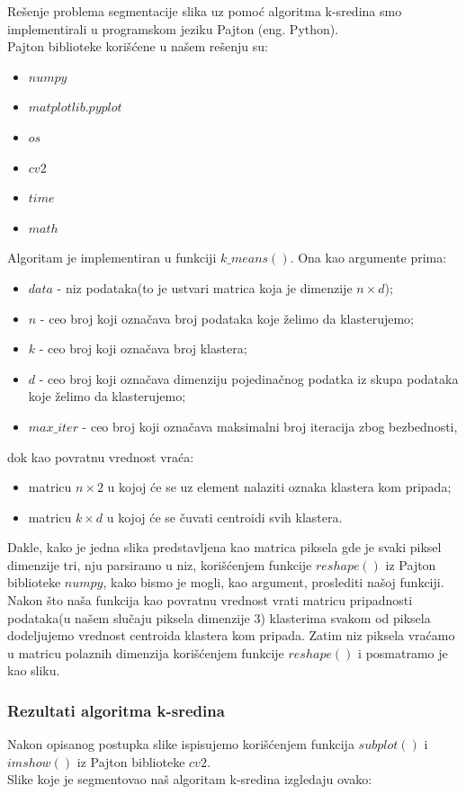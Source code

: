 \documentclass{article}
\begin{document}
\begin{itemize}
Re\v{s}enje problema segmentacije slika uz pomo\'{c} algoritma k-sredina smo implementirali u programskom jeziku Pajton (eng. {\selectfont Python}).\\
Pajton biblioteke kori\v{s}\'{c}ene u na\v{s}em re\v{s}enju su:
\begin{itemize}
\item $ numpy $
\item $ matplotlib.pyplot $
\item $ os $
\item $ cv2 $
\item $ time $
\item $ math $
\end{itemize} 
Algoritam je implementiran u funkciji $ k\_means() $. Ona kao argumente prima:
\begin{itemize}
\item $data$ - niz podataka(to je ustvari matrica koja je dimenzije $n \times d$);
\item $n$ - ceo broj koji ozna\v{c}ava broj podataka koje \v{z}elimo da klasterujemo;
\item $k$ - ceo broj koji ozna\v{c}ava broj klastera;
\item $d$ - ceo broj koji ozna\v{c}ava dimenziju pojedina\v{c}nog podatka iz skupa podataka koje \v{z}elimo da klasterujemo;
\item $max\_iter$ - ceo broj koji ozna\v{c}ava maksimalni broj iteracija zbog bezbednosti,
\end{itemize}
dok kao povratnu vrednost vra\'{c}a:
\begin{itemize} 
\item matricu $n \times 2$ u kojoj \'{c}e se uz element nalaziti oznaka klastera kom pripada;
\item matricu $k \times d$ u kojoj \'{c}e se \v{c}uvati centroidi svih klastera.
\end{itemize}
Dakle, kako je jedna slika predstavljena kao matrica piksela gde je svaki piksel dimenzije tri, nju parsiramo u niz, kori\v{s}\'{c}enjem funkcije  $ reshape() $ iz Pajton biblioteke $ numpy $, kako bismo je mogli, kao argument, proslediti na\v{s}oj funkciji. Nakon \v{s}to na\v{s}a funkcija kao povratnu vrednost vrati matricu pripadnosti podataka(u na\v{s}em slu\v{c}aju piksela dimenzije 3) klasterima svakom od piksela dodeljujemo vrednost centroida klastera kom pripada. Zatim niz piksela vra\'{c}amo u matricu polaznih dimenzija kori\v{s}\'{c}enjem funkcije  $ reshape() $ i posmatramo je kao sliku.

\subsubsection{\selectfont Rezultati algoritma k-sredina}

Nakon opisanog postupka slike ispisujemo kori\v{s}\'{c}enjem funkcija $ subplot() $ i $ imshow() $ iz Pajton biblioteke $ cv2 $.\\
Slike koje je segmentovao na\v{s} algoritam k-sredina izgledaju ovako:

\end{itemize}
\end{document}
